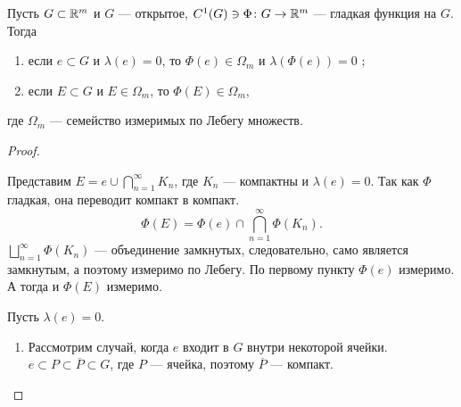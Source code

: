 \begin{thm}
    Пусть $ G \subset \mathbb{R}^{m}$ и $ G$ --- открытое,  $ C^{1}(G) \ni \Phi\colon G \to \mathbb{R}^{m} $ --- гладкая функция на $ G$.
    Тогда
     \begin{enumerate}[noitemsep,label=(\arabic*),noitemsep]
	 \item  если  $ e \subset G$ и $ \lambda (e) = 0$, то $ \Phi(e) \in \Omega _{m}$ и $ \lambda (\Phi(e)) = 0$ ;
	 \item если $ E \subset G$ и $ E \in \Omega _{m}$, то $ \Phi(E) \in \Omega _{m}$,
    \end{enumerate} 
    где $ \Omega _{m}$ --- семейство измеримых по Лебегу множеств.
\end{thm}
\begin{proof}
    $ $
    \begin{description}
        \item {} 
			Представим $ E = e \cup \bigcap_{n=1}^{\infty} K_n$, где $ K_n$ --- компактны и $ \lambda (e) = 0$.
			Так как $ \Phi$ гладкая, она переводит компакт в компакт.
			\[
				\Phi(E)  =\Phi(e) \cap \bigcap_{n=1}^{\infty} \Phi(K_n)
			.\] 
			$ \bigsqcup\limits_{n=1}^{\infty} \Phi(K_n)$ --- объединение замкнутых, следовательно, само является замкнутым, а поэтому измеримо по Лебегу.
			По первому пункту $ \Phi(e) $ измеримо. А тогда и $ \Phi(E)$ измеримо.
		\item {} Пусть $ \lambda (e) = 0$.
			\begin{enumerate}
			    \item Рассмотрим случай, когда $ e$ входит в $ G$ внутри некоторой ячейки.
					$ e \subset P\subset \overline{P} \subset G$, где $ P$ --- ячейка, поэтому $ \overline{P}$ --- компакт.


\end{enumerate}
\end{description}
\end{proof}
